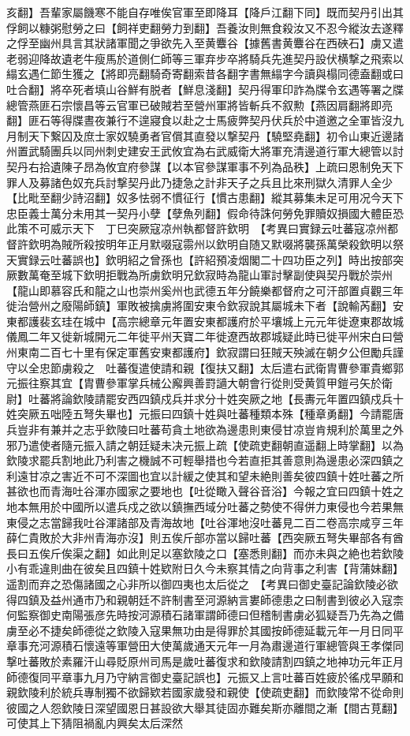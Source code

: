 亥翻】吾輩家屬饑寒不能自存唯俟官軍至即降耳【降戶江翻下同】既而契丹引出其俘飼以糠粥慰勞之曰【飼祥吏翻勞力到翻】吾養汝則無食殺汝又不忍今縱汝去遂釋之俘至幽州具言其狀諸軍聞之爭欲先入至黄麞谷【據舊書黄麞谷在西硤石】虜又遣老弱迎降故遺老牛瘦馬於道側仁師等三軍弃步卒將騎兵先進契丹設伏横撃之飛索以䌈玄遇仁節生獲之【將即亮翻騎奇寄翻索昔各翻字書無䌈字今讀與榻同德盍翻或曰吐合翻】將卒死者填山谷鮮有脱者【鮮息淺翻】契丹得軍印詐為牒令玄遇等署之牒總管燕匪石宗懷昌等云官軍已破賊若至營州軍將皆斬兵不叙勲【燕因肩翻將即亮翻】匪石等得牒晝夜兼行不遑寢食以赴之士馬疲弊契丹伏兵於中道邀之全軍皆沒九月制天下繋囚及庶士家奴驍勇者官償其直發以撃契丹【驍堅堯翻】初令山東近邊諸州置武騎團兵以同州刺史建安王武攸宜為右武威衛大將軍充清邊道行軍大總管以討契丹右拾遺陳子昂為攸宜府參謀【以本官參謀軍事不列為品秩】上疏曰恩制免天下罪人及募諸色奴充兵討撃契丹此乃捷急之計非天子之兵且比來刑獄久清罪人全少【比毗至翻少詩沼翻】奴多怯弱不慣征行【慣古患翻】縱其募集未足可用况今天下忠臣義士萬分未用其一契丹小孽【孽魚列翻】假命待誅何勞免罪贖奴損國大體臣恐此策不可威示天下　丁巳突厥寇凉州執都督許欽明　【考異曰實録云吐蕃寇凉州都督許欽明為賊所殺按明年正月默啜寇霛州以欽明自随又默啜將襲孫萬榮殺欽明以祭天實録云吐蕃誤也】欽明紹之曾孫也【許紹預凌烟閣二十四功臣之列】時出按部突厥數萬奄至城下欽明拒戰為所虜欽明兄欽寂時為龍山軍討擊副使與契丹戰於崇州【龍山即慕容氏和龍之山也崇州奚州也武德五年分饒樂都督府之可汗部置貞觀三年徙治營州之廢陽師鎮】軍敗被擒虜將圍安東令欽寂說其屬城未下者【說輸芮翻】安東都護裴玄珪在城中【高宗總章元年置安東都護府於平壤城上元元年徙遼東郡故城儀鳳二年又徙新城開元二年徙平州天寶二年徙遼西故郡城疑此時已徙平州宋白曰營州東南二百七十里有保定軍舊安東都護府】欽寂謂曰狂賊天殃滅在朝夕公但勵兵謹守以全忠節虜殺之　吐蕃復遣使請和親【復扶又翻】太后遣右武衛胄曹參軍貴鄉郭元振往察其宜【胄曹參軍掌兵械公廨興善罸讁大朝會行從則受黄質甲鎧弓矢於衛尉】吐蕃將論欽陵請罷安西四鎮戍兵并求分十姓突厥之地【長夀元年置四鎮戍兵十姓突厥五咄陸五弩失畢也】元振曰四鎮十姓與吐蕃種類本殊【種章勇翻】今請罷唐兵豈非有兼并之志乎欽陵曰吐蕃苟貪土地欲為邊患則東侵甘凉豈肯規利於萬里之外邪乃遣使者隨元振入請之朝廷疑未决元振上疏【使疏吏翻朝直遥翻上時掌翻】以為欽陵求罷兵割地此乃利害之機誠不可輕舉措也今若直拒其善意則為邊患必深四鎮之利遠甘凉之害近不可不深圖也宜以計緩之使其和望未絶則善矣彼四鎮十姓吐蕃之所甚欲也而青海吐谷渾亦國家之要地也【吐從瞰入聲谷音浴】今報之宜曰四鎮十姓之地本無用於中國所以遣兵戍之欲以鎮撫西域分吐蕃之勢使不得併力東侵也今若果無東侵之志當歸我吐谷渾諸部及青海故地【吐谷渾地沒吐蕃見二百二卷高宗咸亨三年薛仁貴敗於大非州青海亦沒】則五俟斤部亦當以歸吐蕃【西突厥五弩失畢部各有酋長曰五俟斤俟渠之翻】如此則足以塞欽陵之口【塞悉則翻】而亦未與之絶也若欽陵小有乖違則曲在彼矣且四鎮十姓欵附日久今未察其情之向背事之利害【背蒲妹翻】遥割而弃之恐傷諸國之心非所以御四夷也太后從之　【考異曰御史臺記論欽陵必欲得四鎮及益州通市乃和親朝廷不許制書至河源納言婁師德患之曰制書到彼必入寇柰何監察御史南陽張彦先時按河源積石諸軍謂師德曰但稽制書虜必狐疑吾乃先為之備虜至必不捷矣師德從之欽陵入寇果無功由是得罪於其國按師德延載元年一月日同平章事充河源積石懷遠等軍營田大使萬歲通天元年一月為肅邊道行軍總管與王孝傑同撃吐蕃敗於素羅汗山尋貶原州司馬是歲吐蕃復求和欽陵請割四鎮之地神功元年正月師德復同平章事九月乃守納言御史臺記誤也】元振又上言吐蕃百姓疲於徭戍早願和親欽陵利於統兵專制獨不欲歸欵若國家歲發和親使【使疏吏翻】而欽陵常不從命則彼國之人怨欽陵日深望國恩日甚設欲大舉其徒固亦難矣斯亦離間之漸【間古莧翻】可使其上下猜阻禍亂内興矣太后深然